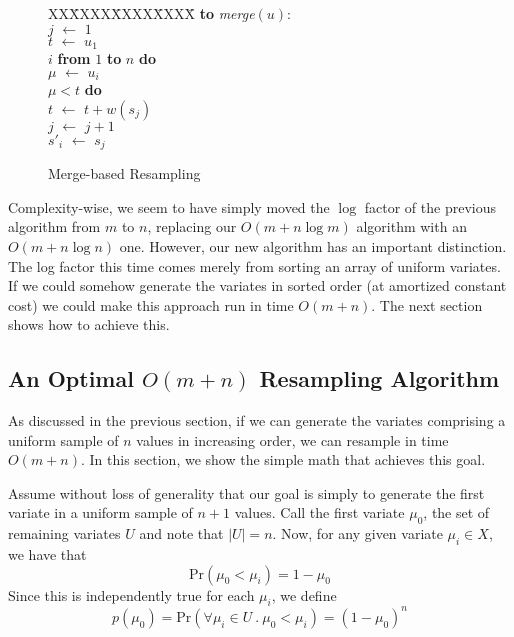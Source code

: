 \documentclass[12pt]{article}
\newcommand{\asgn}{\,\,\leftarrow\,\,}
\newcommand{\Prob}{\textrm{Pr}}
\begin{document}
  \begin{figure}
    \centering
    \begin{minipage}{0.6\textwidth}
      \begin{tabbing}
      XX\=XXXX\=XXXX\=XXXX\=\kill
      {\bf to} {\it merge}$(u)$: \\
      \>$j \asgn 1$ \\
      \>$t \asgn u_1$ \\
       $i$ {\bf from} $1$ {\bf to} $n$ {\bf do} \\
      \>\>$\mu \asgn u_i$ \\
      \> $\mu < t$ {\bf do} \\
      \>\>\>$t \asgn t + w(s_j)$ \\
      \>\>\>$j \asgn j + 1$ \\
      \>\>$s'_i \asgn s_j$
    \end{tabbing}
    \end{minipage}
    \caption{Merge-based Resampling}\label{fig-merge}
  \end{figure}

  Complexity-wise, we seem to have simply moved the $\log$
  factor of the previous algorithm from $m$ to $n$,
  replacing our $O(m + n \log m)$ algorithm with an $O(m + n
  \log n)$ one.  However, our new algorithm has an important
  distinction.  The log factor this time comes merely from
  sorting an array of uniform variates.  If we could somehow
  generate the variates in sorted order (at amortized
  constant cost) we could make this approach run in time
  $O(m + n)$.  The next section shows how to achieve this.

\subsection{An Optimal $O(m + n)$ Resampling Algorithm}\label{sec-optimal}

  As discussed in the previous section, if we can generate
  the variates comprising a uniform sample of $n$ values in
  increasing order, we can resample in time $O(m + n)$.  In
  this section, we show the simple math that achieves this
  goal.

  Assume without loss of generality that our goal is simply
  to generate the first variate in a uniform sample of $n +
  1$ values.  Call the first variate $\mu_0$, the set of
  remaining variates $U$ and note that $|U|=n$.  Now, for
  any given variate $\mu_i \in X$, we have that
    $$ \Prob(\mu_0 < \mu_i) = 1 - \mu_0 $$
  Since this is independently true for each $\mu_i$, we define
    $$p(\mu_0) = \Prob(\forall \mu_i \in U ~.~ \mu_0 < \mu_i) = (1 - \mu_0)^n$$
  
\end{document}
